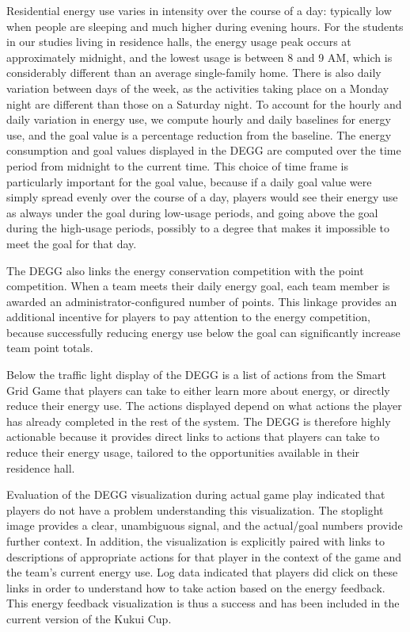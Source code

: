 \documentclass[10pt, conference, compsocconf]{IEEEtran-old}
\begin{document}
Residential energy use varies in intensity over the course of a day: typically low when people are sleeping and much higher during evening hours. For the students in our studies living in residence halls, the energy usage peak occurs at approximately midnight, and the lowest usage is between 8 and 9 AM, which is considerably different than an average single-family home. There is also daily variation between days of the week, as the activities taking place on a Monday night are different than those on a Saturday night. To account for the hourly and daily variation in energy use, we compute hourly and daily baselines for energy use, and the goal value is a percentage reduction from the baseline. The energy consumption and goal values displayed in the DEGG are computed over the time period from midnight to the current time. This choice of time frame is particularly important for the goal value, because if a daily goal value were simply spread evenly over the course of a day, players would see their energy use as always under the goal during low-usage periods, and going above the goal during the high-usage periods, possibly to a degree that makes it impossible to meet the goal for that day.

The DEGG also links the energy conservation competition with the point competition. When a team meets their daily energy goal, each team member is awarded an administrator-configured number of points. This linkage provides an additional incentive for players to pay attention to the energy competition, because successfully reducing energy use below the goal can significantly increase team point totals.

Below the traffic light display of the DEGG is a list of actions from the Smart Grid Game that players can take to either learn more about energy, or directly reduce their energy use. The actions displayed depend on what actions the player has already completed in the rest of the system. The DEGG is therefore highly actionable because it provides direct links to actions that players can take to reduce their energy usage, tailored to the opportunities available in their residence hall.

Evaluation of the DEGG visualization during actual game play indicated that players do not have a problem understanding this visualization. The stoplight image provides a clear, unambiguous signal, and the actual/goal numbers provide further context. In addition, the visualization is explicitly paired with links to descriptions of appropriate actions for that player in the context of the game and the team's current energy use. Log data indicated that players did click on these links in order to understand how to take action based on the energy feedback. This energy feedback visualization is thus a success and has been included in the current version of the Kukui Cup.
\end{document}
